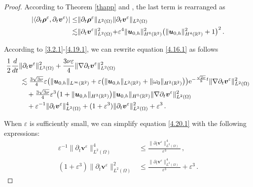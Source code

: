 \documentclass[10pt,a4paper]{amsart}
\begin{document}
\begin{proof}
	
	
	
	According to Theorem \ref{thapp} and , the last term is rearranged as
	\begin{align}\label{4.19.1}
		|\langle
		\partial_t\boldsymbol \rho^{\varepsilon}	,\partial_t{\boldsymbol v}^{\varepsilon}\rangle|
		\leq&
		\lVert
		\partial_t\boldsymbol{\rho}^\varepsilon\rVert_{{L}^{2}(\Omega)}
		\rVert
		\partial_t{\boldsymbol v}^{\varepsilon}
		\lVert_{{L}^2(\Omega)}
		\notag\\	
		\lesssim&
		\rVert
		\partial_t{\boldsymbol v}^{\varepsilon}
		\lVert^2_{{L}^2(\Omega)}
		+\varepsilon^4
		\lVert
		{\boldsymbol{u}}_{0,h}
		\rVert^2_{{H}^{6}(\mathbb{R}^2)}
		\big(
		\lVert
		{\boldsymbol{u}}_{0,h}
		\rVert^2_{{H}^{4}(\mathbb{R}^2)}
		+1
		\big)^2
		\,.
	\end{align}

	
	
	
	According to \eqref{3.2.1}-\eqref{4.19.1}, we can rewrite equation \eqref{4.16.1} as follows
	\begin{align}
		\label{4.20.1}
		&\frac{1}{2}\frac{d}{dt}\lVert\partial_t\boldsymbol v^{\varepsilon}\rVert^2_{{L}^2(\Omega)}
		+\frac{3\nu\varepsilon}{4}\lVert\nabla\partial_t\boldsymbol v^{\varepsilon}\rVert^2_{{L}^2(\Omega)}\notag\\
		&\qquad\lesssim
		\tfrac{3\sqrt{3\nu}}{4}
		\varepsilon
		\big(
		\lVert{\boldsymbol{u}}_{0,h}\rVert_{L^\infty(\mathbb{R}^2)} 
			+\varepsilon\big(
		\lVert{\boldsymbol{u}}_{0,h}\rVert_{L^2(\mathbb{R}^2)}+\lVert{\omega}_0\rVert_{H^2(\mathbb{R}^2)}
		\big)
		\big)\mathrm{e}^{-\frac{\sqrt{2\nu}}{8}  t}
		\lVert\nabla\partial_t{\boldsymbol v}^{\varepsilon}\rVert^2_{{L}^2(\Omega)}
		\notag\\
		&\qquad\quad+
		\tfrac{3\sqrt{3\nu}}{4}\varepsilon^3
		\big(
		1+
		\lVert {\boldsymbol{u}}_{0,h} \rVert_{H^{3}(\mathbb{R}^2)}
		\big)
		\lVert {\boldsymbol{u}}_{0,h} \rVert_{H^{5}(\mathbb{R}^2)}
		\lVert\nabla\partial_t{\boldsymbol v}^{\varepsilon}\rVert^2_{{L}^2(\Omega)}\notag\\
		&\qquad\quad
		+
		\varepsilon^{-1}\lVert
		\partial_t{\boldsymbol v}^{\varepsilon} 	\rVert^{4}_{{L}^2(\Omega)}
		+		(1+\varepsilon^{3})\lVert
		\partial_t{\boldsymbol v}^{\varepsilon} 	\rVert^{2}_{{L}^2(\Omega)}+
		\varepsilon^3
		\,.
	\end{align}
	
	
	
	When  $\varepsilon$ is sufficiently small, we can simplify equation \eqref{4.20.1} with the following expressions:
	\begin{align}
		 \varepsilon^{-1} \lVert
		\partial_t{\boldsymbol v}^{\varepsilon} 	\rVert^{4}_{{L}^2(\Omega)}&\leq
		\frac{
			\lVert
			\partial_t{\boldsymbol v}^{\varepsilon} 	\rVert^{4}_{{L}^2(\Omega)}
		}{
			\varepsilon^3 
		}\,,\label{1}\\
		(1+\varepsilon^{3} )\lVert
		\partial_t{\boldsymbol v}^{\varepsilon} 	\rVert^{2}_{{L}^2(\Omega)}&\leq
		\frac{
			\lVert
			\partial_t{\boldsymbol v}^{\varepsilon} 	\rVert^{4}_{{L}^2(\Omega)}
		}{
			\varepsilon^3 
		}
		+\varepsilon^3 \,.\label{2}
	\end{align}
	

\end{proof}
\end{document}
